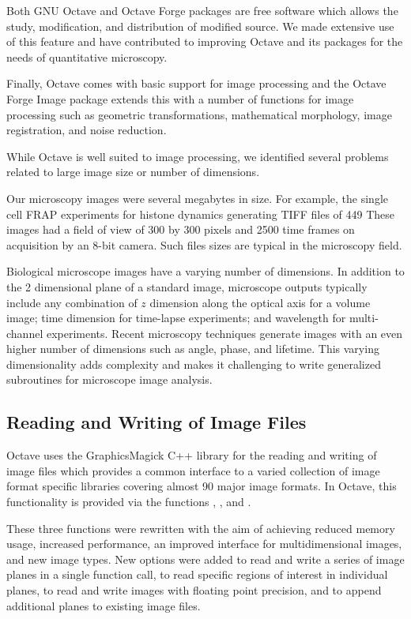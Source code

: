 Both GNU Octave and Octave Forge packages are free software which allows
the study, modification, and distribution of modified source.
We made extensive
use of this feature and have contributed to improving Octave and its
packages for the needs of quantitative microscopy.

Finally, Octave comes with basic support for image processing and the
Octave Forge Image package extends this with a number of functions for
image processing such as geometric transformations, mathematical
morphology, image registration, and noise reduction.

While Octave is well suited to image
processing, we identified several problems related to
large image size or number of dimensions.

Our microscopy images
were several megabytes in size.  For example, the single cell
FRAP experiments for histone dynamics generating TIFF files of 449
These images had a field of view of 300
by 300 pixels and 2500 time frames
on acquisition by an 8-bit camera.
Such files sizes are typical in the microscopy field.

Biological microscope images have a varying number of dimensions.
In addition to the 2 dimensional plane of a standard image, microscope
outputs typically include any combination of $z$ dimension along
the optical axis for a volume image; time dimension for time-lapse
experiments; and wavelength for multi-channel experiments.  Recent microscopy
techniques generate images with an even higher number of dimensions
such as angle, phase, and lifetime.  This varying dimensionality adds
complexity and makes it challenging to write generalized subroutines for
microscope image analysis.

\subsection{Reading and Writing of Image Files}

Octave uses the GraphicsMagick C++ library for the reading and writing
of image files which provides a common interface
to a varied collection of
image format specific libraries covering almost
90 major image formats.  In Octave, this functionality is
provided via the functions , , and
.

These three functions were rewritten with the aim of achieving
reduced memory usage, increased performance, an improved
interface for multidimensional images, and new image types.
New options were added to read and write a series of image planes
in a single function call, to read specific regions of interest in
individual planes, to read and write images
with floating point precision, and to append additional planes to existing image
files.

